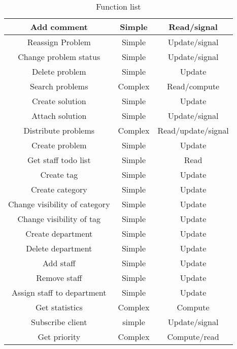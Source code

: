 \begin{table}[h]
\begin{center}
\begin{tabular}{|c|c|c|}
\hline
Add comment &   Simple & Read/signal   \\ \hline%
Reassign Problem & Simple   & Update/signal \\ \hline%
Change problem status &   Simple & Update/signal \\ \hline%
Delete problem & Simple &   Update \\   \hline%
Search problems & Complex &   Read/compute \\ \hline%
Create solution & Simple &   Update \\   \hline%
Attach solution & Simple &   Update/signal \\   \hline%
Distribute problems &   Complex & Read/update/signal \\   \hline%
Create problem &   Simple & Update \\   \hline%
Get staff todo list & Simple & Read \\   \hline%
Create tag & Simple &   Update \\ \hline%
Create category & Simple & Update \\ \hline%
Change visibility of category &   Simple &   Update \\   \hline%
Change visibility of tag &   Simple &  Update \\ \hline%
Create department & Simple & Update \\ \hline%
Delete department & Simple & Update \\ \hline%
Add staff & Simple & Update \\ \hline%
Remove staff & Simple & Update \\ \hline%
Assign staff to department & Simple & Update \\ \hline%
Get statistics & Complex & Compute \\ \hline%
Subscribe client & simple & Update/signal \\ \hline%
Get priority & Complex & Compute/read \\ \hline%



\end{tabular}
\end{center}
\caption{Function list}
\label{tab:functionlist}
\end{table}

